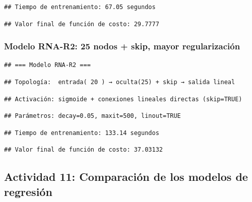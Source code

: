 \documentclass[
]{article}
\begin{document}
\begin{verbatim}
## Tiempo de entrenamiento: 67.05 segundos
\end{verbatim}

\begin{verbatim}
## Valor final de función de costo: 29.7777
\end{verbatim}

\subsubsection{Modelo RNA-R2: 25 nodos + skip, mayor
regularización}\label{modelo-rna-r2-25-nodos-skip-mayor-regularizaciuxf3n}

\begin{verbatim}
## === Modelo RNA-R2 ===
\end{verbatim}

\begin{verbatim}
## Topología:  entrada( 20 ) → oculta(25) + skip → salida lineal
\end{verbatim}

\begin{verbatim}
## Activación: sigmoide + conexiones lineales directas (skip=TRUE)
\end{verbatim}

\begin{verbatim}
## Parámetros: decay=0.05, maxit=500, linout=TRUE
\end{verbatim}

\begin{verbatim}
## Tiempo de entrenamiento: 133.14 segundos
\end{verbatim}

\begin{verbatim}
## Valor final de función de costo: 37.03132
\end{verbatim}

\subsection{Actividad 11: Comparación de los modelos de
regresión}\label{actividad-11-comparaciuxf3n-de-los-modelos-de-regresiuxf3n}
\end{document}
